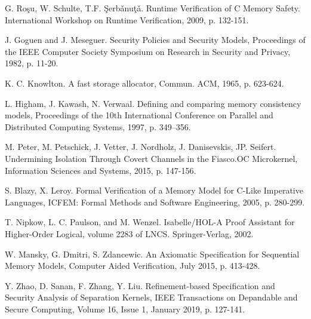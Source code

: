 \documentclass[runningheads]{llncs}
\begin{document}
\begin{thebibliography}{8}
G. Ro\c{s}u, W. Schulte, T.F. \c{S}erb\v{a}nu\c{t}\v{a}. Runtime Verification of C Memory Safety. International Workshop on Runtime Verification, 2009, p. 132-151.

J. Goguen and J. Meseguer. Security Policies and Security Models, Proceedings of the IEEE Computer Society Symposium on Research in Security and Privacy, 1982, p. 11-20.

K. C. Knowlton. A fast storage allocator, Commun. ACM, 1965, p. 623-624.

L. Higham, J. Kawash, N. Verwaal. Defining and comparing memory consistency
models, Proceedings of the 10th International Conference on Parallel and Distributed Computing Systems, 1997, p. 349–356.

M. Peter, M. Petschick, J. Vetter, J. Nordholz, J. Danisevskis, JP. Seifert. Undermining Isolation Through Covert Channels in the Fiasco.OC Microkernel, Information Sciences and Systems, 2015, p. 147-156.

S. Blazy, X. Leroy. Formal Verification of a Memory Model for C-Like Imperative Languages, ICFEM: Formal Methods and Software Engineering, 2005, p. 280-299.

T. Nipkow, L. C. Paulson, and M. Wenzel. Isabelle/HOL-A Proof Assistant for Higher-Order Logical, volume 2283 of LNCS. Springer-Verlag, 2002.

W. Mansky, G. Dmitri, S. Zdancewic. An Axiomatic Specification for Sequential Memory Models, Computer Aided Verification, July 2015, p. 413-428.

Y. Zhao, D. Sanan, F. Zhang, Y. Liu. Refinement-based Specification and Security Analysis of Separation Kernels, IEEE Transactions on Depandable and Secure Computing, Volume 16, Issue 1, January 2019, p. 127-141.

\end{thebibliography}
\end{document}
